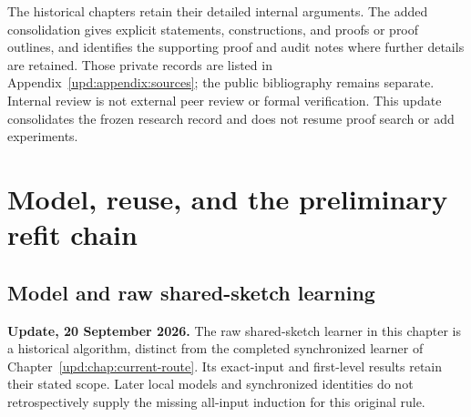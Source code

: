 \documentclass[11pt,oneside,openany,a4paper]{book}
\numberwithin{equation}{chapter}
\theoremstyle{definition}
\theoremstyle{remark}
\newcommand{\proofstep}[1]{\par\addvspace{.45\baselineskip}\Needspace{3\baselineskip}\textbf{#1}\par\nobreak}
\newcommand{\R}{\mathbb R}\newcommand{\E}{\mathbb E}\newcommand{\Prb}{\mathbb P}\newcommand{\PP}{\mathbb P}
\newcommand{\T}{\mathsf T}\newcommand{\Id}{I}
\newcommand{\F}[1]{\left\lVert#1\right\rVert_F}
\newcommand{\N}[1]{\left\lVert#1\right\rVert}
\newcommand{\op}[1]{\left\lVert#1\right\rVert_{\rm op}}
\newcommand{\ip}[2]{\left\langle#1,#2\right\rangle_F}
\DeclareMathOperator{\tr}{tr}\DeclareMathOperator{\rank}{rank}
\DeclareMathOperator{\diag}{blockdiag}\DeclareMathOperator{\range}{range}
\DeclareMathOperator{\HSS}{HSS}\DeclareMathOperator{\dist}{dist}
\DeclareMathOperator{\Var}{Var}\DeclareMathOperator{\supp}{supp}
\newcommand{\UC}{\mathcal U}\newcommand{\VC}{\mathcal V}\newcommand{\err}{\mathcal E}
\newcommand{\Sn}[2]{\left\lVert#1\right\rVert_{S_{#2}}}
\newcommand{\Cov}{\mathsf C}\newcommand{\Loss}{\mathsf L}\newcommand{\Fil}{\mathcal F}
\DeclareMathOperator{\diver}{div}\DeclareMathOperator{\vecop}{vec}\DeclareMathOperator{\Gammafun}{Gamma}
\begin{document}
The historical chapters retain their detailed internal arguments.
The added consolidation gives explicit statements, constructions, and
proofs or proof outlines, and identifies the supporting proof and audit
notes where further details are retained. Those private records are listed
in Appendix~\ref{upd:appendix:sources}; the public bibliography remains
separate. Internal review is not external peer review or formal verification.
This update consolidates the frozen research record and does not resume
proof search or add experiments.
\clearpage
\tableofcontents
\clearpage

\mainmatter

\part{Model, reuse, and the preliminary refit chain}

\begingroup
\let\R\relax
\newcommand{\R}{\mathbb R}
\let\E\relax
\newcommand{\E}{\mathbb E}
\let\Prb\relax
\newcommand{\Prb}{\mathbb P}
\let\T\relax
\newcommand{\T}{\mathsf T}
\let\F\relax
\newcommand{\F}[1]{\left\lVert#1\right\rVert_{F}}
\let\N\relax
\newcommand{\N}[1]{\left\lVert#1\right\rVert}
\let\ip\relax
\newcommand{\ip}[2]{\left\langle#1,#2\right\rangle_F}
\let\tr\relax
\newcommand{\tr}{\operatorname{tr}}
\let\rank\relax
\newcommand{\rank}{\operatorname{rank}}
\let\diag\relax
\newcommand{\diag}{\operatorname{blockdiag}}
\let\range\relax
\newcommand{\range}{\operatorname{range}}
\let\OPT\relax
\newcommand{\OPT}{\operatorname{OPT}}
\let\HSS\relax
\newcommand{\HSS}{\operatorname{HSS}}
\let\diver\relax
\newcommand{\diver}{\operatorname{div}}
\let\Var\relax
\newcommand{\Var}{\operatorname{Var}}
\let\UC\relax
\newcommand{\UC}{\mathcal U}
\let\VC\relax
\newcommand{\VC}{\mathcal V}
\let\err\relax
\newcommand{\err}{\mathcal E}
\let\proofstep\relax
\newcommand{\proofstep}[1]{\par\addvspace{.45\baselineskip}\Needspace{3\baselineskip}\textbf{#1}\par\nobreak}
\let\op\relax
\newcommand{\op}[1]{\left\lVert#1\right\rVert_{\mathrm{op}}}
\let\Sn\relax
\newcommand{\Sn}[2]{\left\lVert#1\right\rVert_{S_{#2}}}
\let\Cov\relax
\newcommand{\Cov}{\mathsf C}
\let\Loss\relax
\newcommand{\Loss}{\mathsf L}
\let\Fil\relax
\newcommand{\Fil}{\mathcal F}
\let\Id\relax
\newcommand{\Id}{I}
\let\supp\relax
\newcommand{\supp}{\operatorname{supp}}
\let\vecop\relax
\newcommand{\vecop}{\operatorname{vec}}
\let\Gammafun\relax
\newcommand{\Gammafun}{\operatorname{Gamma}}
\chapter{Model and raw shared-sketch learning}\label{ch:foundations}
\begin{scopebox}
\textbf{Update, 20 September 2026.} The raw shared-sketch learner in this chapter is a historical algorithm, distinct from the completed synchronized learner of Chapter~\ref{upd:chap:current-route}. Its exact-input and first-level results retain their stated scope. Later local models and synchronized identities do not retrospectively supply the missing all-input induction for this original rule.
\end{scopebox}
\end{document}
